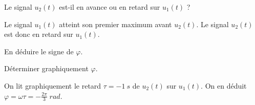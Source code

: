 
\begin{enonce}
Le signal $u_2(t)$ est-il en avance ou en retard sur $u_1(t)$ ?
\end{enonce}


\begin{corrige}
Le signal $u_1(t)$ atteint son premier maximum avant $u_2(t)$. Le signal $u_2(t)$ est donc en retard sur $u_1(t)$.
\end{corrige}




\begin{enonce}
En déduire le signe de $\varphi$.
\end{enonce}






\begin{enonce}
Déterminer graphiquement $\varphi$.
\end{enonce}


\begin{corrige}
On lit graphiquement le retard $\tau=\SI{-1}{s}$ de $u_2(t)$ sur $u_1(t)$. On en déduit $\varphi=\omega \tau=-\frac{2\pi}{3}\;\si{rad}$.
\end{corrige}



\finEntrainement




\hauteurLargeurCadreReponse		{6mm}{1.5cm}
\initialisationEntrainement


